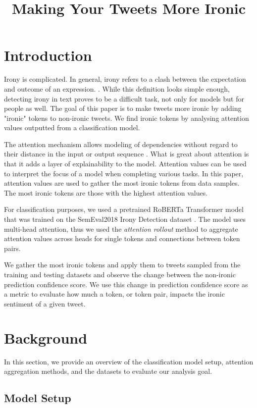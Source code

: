 \documentclass[10pt, a4paper]{article}
\title{Making Your Tweets More Ironic}
\begin{document}
\maketitleabstract

\section{Introduction}

Irony is complicated.
In general, irony refers to a clash between the expectation and outcome of an expression. \citep{kreutz-20}. 
While this definition looks simple enough, detecting irony in text proves to be a difficult task, not only for models but for people as well.
The goal of this paper is to make tweets more ironic by adding "ironic" tokens to non-ironic tweets.
We find ironic tokens by analysing attention values outputted from a classification model.

The attention mechanism allows modeling of dependencies without regard to their distance in the input or output sequence \citep{all-you-need}.
What is great about attention is that it adds a layer of explainability to the model. Attention values can be used to interpret the focus of a model when completing various tasks.
In this paper, attention values are used to gather the most ironic tokens from data samples. The most ironic tokens are those with the highest attention values.

For classification purposes, we used a pretrained RoBERTa Transformer model that was trained on the SemEval2018 Irony Detection dataset \citep{roberta}.
The model uses multi-head attention, thus we used the \textit{attention rollout} method to aggregate attention values across heads for single tokens and connections between token pairs.

We gather the most ironic tokens and apply them to tweets sampled from the training and testing datasets and observe the change between the non-ironic prediction confidence score.
We use this change in prediction confidence score as a metric to evaluate how much a token, or token pair, impacts the ironic sentiment of a given tweet.

\section{Background}

In this section, we provide an overview of the classification model setup, attention aggregation methods, and the datasets to evaluate our analysis goal.

\subsection{Model Setup}
\label{sec:first}
\end{document}
